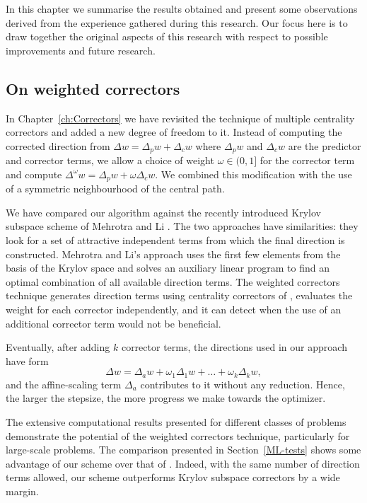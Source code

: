 
%
%
\label{ch:Conclusions}

In this chapter we summarise the results obtained and 
present some observations derived from the experience
gathered during this research.
Our focus here is to draw together the original aspects of this research
with respect to possible improvements and future research.

%
%
\subsection*{On weighted correctors}

In Chapter~\ref{ch:Correctors} we have revisited the 
technique of multiple centrality correctors \cite{Gondzio96} 
and added a new degree of freedom to it. 
Instead of computing the corrected direction from 
$\Delta w = \Delta_p w + \Delta_c w$ where 
$\Delta_p w$ and $\Delta_c w$ are the predictor and corrector terms, 
we allow a choice of weight 
$\omega \in (0,1]$ for the corrector term and compute 
$\Delta^\omega w = \Delta_p w + \omega \Delta_c w$.
We combined this modification with the use of a symmetric neighbourhood
of the central path. 

We have compared our algorithm against the recently introduced 
Krylov subspace scheme of Mehrotra and Li \cite{MehrotraLi}.
The two approaches have similarities: they look for a set of attractive 
independent terms from which the final direction is constructed. 
Mehrotra and Li's approach uses the first few elements from the basis
of the Krylov space and solves an auxiliary linear program to find an
optimal combination of all available direction terms.
The weighted correctors technique generates direction terms using 
centrality correctors of \cite{Gondzio96}, evaluates the weight
for each corrector independently, and it can detect when the use
of an additional corrector term would not be beneficial.

Eventually, after adding $k$ corrector terms, 
the directions used in our approach have form
\[
  \Delta w = \Delta_a w + \omega_1\Delta_1 w + \ldots + \omega_k\Delta_k w,
\]
and the affine-scaling term $\Delta_a$ contributes to it without any
reduction. Hence, the larger the stepsize, the more progress we make
towards the optimizer.

The extensive computational results presented for different 
classes of problems demonstrate the potential of the
weighted correctors technique, particularly for large-scale problems.
The comparison presented in Section~\ref{ML-tests} 
shows some advantage
of our scheme over that of \cite{MehrotraLi}. Indeed, with the same 
number of direction terms allowed, our scheme outperforms Krylov subspace 
correctors by a wide margin.

